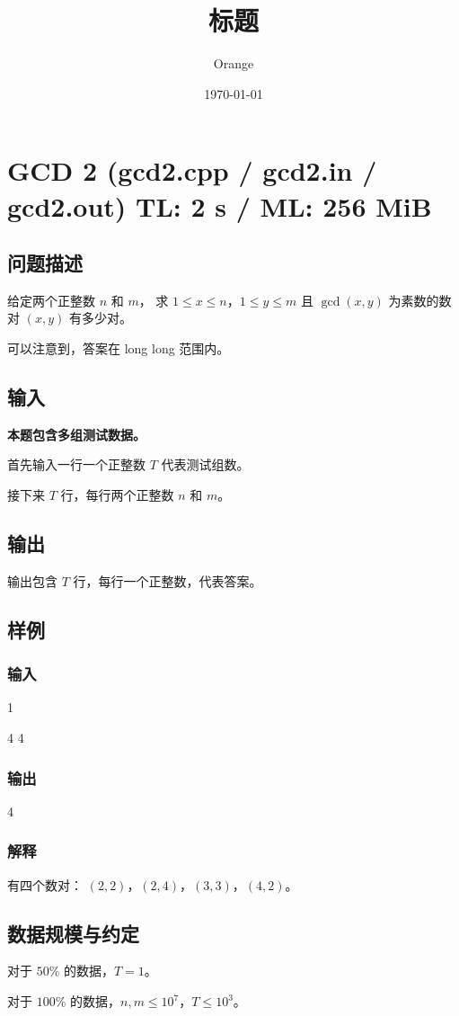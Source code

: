 \documentclass[UTF8]{article}
\title{标题}
\author{Orange}
\date{\today}
\begin{document}
	\heiti

	\section{GCD 2 \small(gcd2.cpp / gcd2.in / gcd2.out) TL: 2 s / ML: 256 MiB}
	\subsection{问题描述}
	给定两个正整数 $n$ 和 $m$，
	求 $1 \le x \le n$，$1 \le y \le m$ 且 $\gcd(x, y)$ 为素数的数对 $(x, y)$ 有多少对。

	可以注意到，答案在 long long 范围内。

	\subsection{输入}
	\textbf{本题包含多组测试数据。}

	首先输入一行一个正整数 $T$ 代表测试组数。

	接下来 $T$ 行，每行两个正整数 $n$ 和 $m$。

	\subsection{输出}
	输出包含 $T$ 行，每行一个正整数，代表答案。

	\subsection{样例}
	\subsubsection{输入}
	1

	4 4

	\subsubsection{输出}
	4

	\subsubsection{解释}
	有四个数对：
	$(2, 2)$，$(2, 4)$，$(3, 3)$，$(4,2)$。

	\subsection{数据规模与约定}
	对于 $50\%$ 的数据，$T = 1$。
	
	对于 $100\%$ 的数据，$n, m \le 10^7$，$T \le 10^3$。
\end{document}
